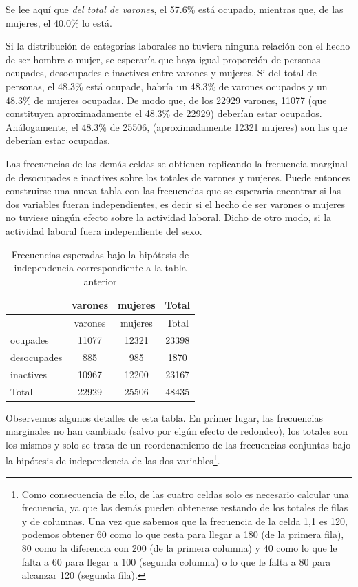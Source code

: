 \documentclass[]{book}
\let\rmarkdownfootnote\footnote%
\def\footnote{\protect\rmarkdownfootnote}
\begin{document}
Se lee aquí que \emph{del total de varones}, el 57.6\% está ocupado, mientras que, de las mujeres, el 40.0\% lo está.

Si la distribución de categorías laborales no tuviera ninguna relación con el hecho de ser hombre o mujer, se esperaría que haya igual proporción de personas ocupades, desocupades e inactives entre varones y mujeres. Si del total de personas, el 48.3\% está ocupade, habría un 48.3\% de varones ocupados y un 48.3\% de mujeres ocupadas. De modo que, de los 22929 varones, 11077 (que constituyen aproximadamente el 48.3\% de 22929) deberían estar ocupados. Análogamente, el 48.3\% de 25506,
(aproximadamente 12321 mujeres) son las que deberían estar ocupadas.

Las frecuencias de las demás celdas se obtienen replicando la frecuencia marginal de desocupades e inactives sobre los totales de varones y mujeres. Puede entonces construirse una nueva tabla con las frecuencias que se esperaría encontrar si las dos variables fueran independientes, es decir si el hecho de ser varones o mujeres no tuviese ningún efecto sobre la actividad laboral. Dicho de otro modo, si la actividad laboral fuera independiente del sexo.

\begin{longtable}[]{@{}lccc@{}}
\caption{\label{tab:unnamed-chunk-123}Frecuencias esperadas bajo la hipótesis de independencia
correspondiente a la tabla anterior}\tabularnewline
\toprule
& varones & mujeres & Total\tabularnewline
\midrule
\endfirsthead
\toprule
& varones & mujeres & Total\tabularnewline
\midrule
\endhead
ocupades & 11077 & 12321 & 23398\tabularnewline
desocupades & 885 & 985 & 1870\tabularnewline
inactives & 10967 & 12200 & 23167\tabularnewline
Total & 22929 & 25506 & 48435\tabularnewline
\bottomrule
\end{longtable}

Observemos algunos detalles de esta tabla. En primer lugar, las frecuencias marginales no han cambiado (salvo por elgún efecto de redondeo), los totales son los mismos y solo se trata de un reordenamiento de las frecuencias conjuntas bajo la hipótesis de independencia de las dos variables\footnote{Como consecuencia de ello, de las cuatro celdas solo es necesario calcular una frecuencia, ya que las demás pueden obtenerse restando de los totales de filas y de columnas. Una vez que sabemos que la frecuencia de la celda 1,1 es 120, podemos obtener 60 como lo que resta para llegar a 180 (de la primera fila), 80 como la diferencia con 200 (de la primera columna) y 40 como lo que le falta a 60 para llegar a 100 (segunda columna) o lo que le falta a 80 para alcanzar 120 (segunda fila).}.
\end{document}
